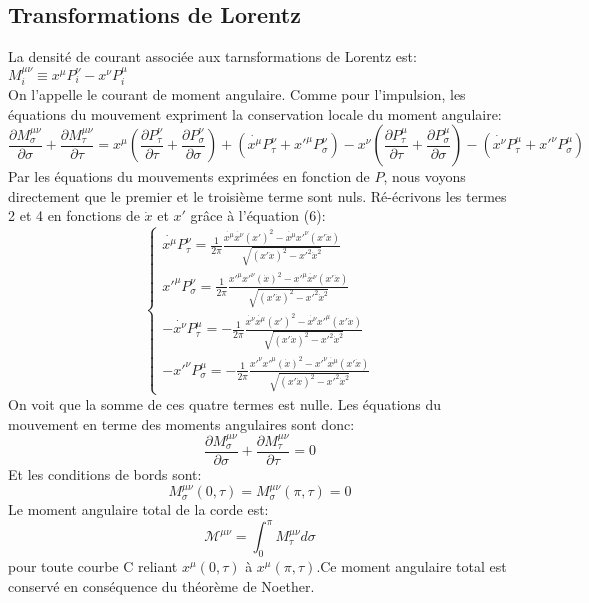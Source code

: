 \documentclass[a4paper,12pt]{article}
\def\xmu{x^\mu}
\begin{document}
\subsection{Transformations de Lorentz}
La densité de courant associée aux tarnsformations de Lorentz est:
$M_{i}^{\mu\nu}\equiv x^{\mu}P^{\nu}_{i}-x^{\nu}P^{\mu}_{i}$\\
On l'appelle le courant de moment angulaire.
Comme pour l'impulsion, les équations du mouvement expriment la conservation locale du moment angulaire:
$$\frac{\partial M_{\sigma}^{\mu\nu}}{\partial \sigma}+\frac{\partial M_{\tau}^{\mu\nu}}{\partial \tau}=x^{\mu}\left( \frac{\partial P^{\nu}_{\tau}}{\partial \tau}+\frac{\partial P^{\nu}_{\sigma}}{\partial \sigma}\right) +\left( \dot{x^{\mu}}P^{\nu}_{\tau}+x'^{\mu}P^{\nu}_{\sigma}\right) -x^{\nu}\left( \frac{\partial P^{\mu}_{\tau}}{\partial \tau}+\frac{\partial P^{\mu}_{\sigma}}{\partial \sigma}\right) -\left( \dot{x^{\nu}}P^{\mu}_{\tau}+x'^{\nu}P^{\mu}_{\sigma}\right)$$
Par les équations du mouvements exprimées en fonction de $P$, nous voyons directement que le premier et le troisième terme sont nuls. 
Ré-écrivons les termes 2 et 4 en fonctions de $\dot{x}$ et $x'$ grâce à l'équation (6):
\begin{equation}
	\left\lbrace
	\begin{aligned}
	\dot{x^{\mu}}P^{\nu}_{\tau}=\frac{1}{2\pi}\frac{\dot{\xmu}\dot{x^\nu}(x')^2-\dot{\xmu}x'^\nu(x'\dot{x})}{\sqrt{(x'\dot{x})^2-x'^2\dot{x}^2}}\\
	x'^{\mu}P^{\nu}_{\sigma}=\frac{1}{2\pi}\frac{x'^\mu x'^\nu (\dot{x})^2-x'^{\mu}\dot{x^\nu}(x'\dot{x})}{\sqrt{(x'\dot{x})^2-x'^2\dot{x}^2}}\\
	-\dot{x^{\nu}}P^{\mu}_{\tau}=-\frac{1}{2\pi}\frac{\dot{x^\nu}\dot{\xmu}(x')^2-\dot{x^\nu}x'^\mu(x'\dot{x})}{\sqrt{(x'\dot{x})^2-x'^2\dot{x}^2}}\\
	-x'^{\nu}P^{\mu}_{\sigma}=-\frac{1}{2\pi}\frac{x'^{\nu}x'^\mu (\dot{x})^2-x'^{\nu}\dot{\xmu}(x'\dot{x})}{\sqrt{(x'\dot{x})^2-x'^2\dot{x}^2}}
	\end{aligned}
	\right.
\end{equation}
On voit que la somme de ces quatre termes est nulle. 
Les équations du mouvement en terme des moments angulaires sont donc:
$$\frac{\partial M_{\sigma}^{\mu\nu}}{\partial \sigma}+\frac{\partial M_{\tau}^{\mu\nu}}{\partial \tau}=0$$
Et les conditions de bords sont:
$$M_{\sigma}^{\mu\nu}(0,\tau)=M_{\sigma}^{\mu\nu}(\pi,\tau)=0$$
Le moment angulaire total de la corde est: 
$$\mathcal{M^{\mu\nu}}=\int_{0}^{\pi}M^{\mu\nu}_{\tau}d\sigma$$
pour toute courbe C reliant $x^{\mu}(0,\tau)$ à $x^{\mu}(\pi,\tau)$.Ce moment angulaire total est conservé en conséquence du théorème de Noether.
\end{document}
